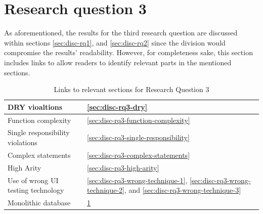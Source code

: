 \section{Research question 3} \label{sec:disc-rq3-monolithic-db}

As aforementioned, the results for the third research question are discussed within sections \ref{sec:disc-rq1}, and \ref{sec:disc-rq2} since the division would compromise the results' readability. However, for completeness sake, this section includes links to allow readers to identify relevant parts in the mentioned sections.


\begin{table}[!hbtp]
\centering
\begin{tabular}{|l|l|}

\hline

DRY vioaltions                     & \ref{sec:disc-rq3-dry}                                                                                               \\ \hline
Function complexity                & \ref{sec:disc-rq3-function-complexity}                                                                               \\ \hline
Single responsibility violations   & \ref{sec:disc-rq3-single-responsibility}                                                                             \\ \hline
Complex statements                 & \ref{sec:disc-rq3-complex-statements}                                                                                \\ \hline
High Arity                         & \ref{sec:disc-rq3-high-arity}                                                                                        \\ \hline
Use of wrong UI testing technology & \ref{sec:disc-rq3-wrong-technique-1}, \ref{sec:disc-rq3-wrong-technique-2}, and \ref{sec:disc-rq3-wrong-technique-3} \\ \hline
Monolithic database                & \ref{sec:disc-rq3-monolithic-db}    \\                                                                               \hline
\end{tabular}
\caption{Links to relevant sections for Research Question 3}
\label{tab:disc-rq3-links}
\end{table}
